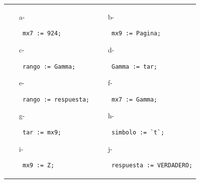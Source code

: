 \documentclass[a4paper,10pt]{article}
\begin{document}
\begin{enumerate}
\begin{tabular}{p{} p{}}
    \begin{itemize}
        \item[a-] \begin{verbatim} mx7 := 924;\end{verbatim}
        \item[c-] \begin{verbatim} rango := Gamma;\end{verbatim}
        \item[e-] \begin{verbatim} rango := respuesta;\end{verbatim}
         \item[g-] \begin{verbatim} tar := mx9;\end{verbatim}
         \item[i-] \begin{verbatim} mx9 := Z;\end{verbatim}
    \end{itemize}
&
    \begin{itemize}
       \item[b-] \begin{verbatim} mx9 := Pagina;\end{verbatim}
       \item[d-] \begin{verbatim} Gamma := tar;\end{verbatim}
        \item[f-] \begin{verbatim} mx7 := Gamma;\end{verbatim}
         \item[h-] \begin{verbatim} simbolo := `t`;\end{verbatim}
          \item[j-] \begin{verbatim} respuesta := VERDADERO;\end{verbatim}
    \end{itemize}
\\
\end{tabular}


\end{enumerate}
\end{document}
